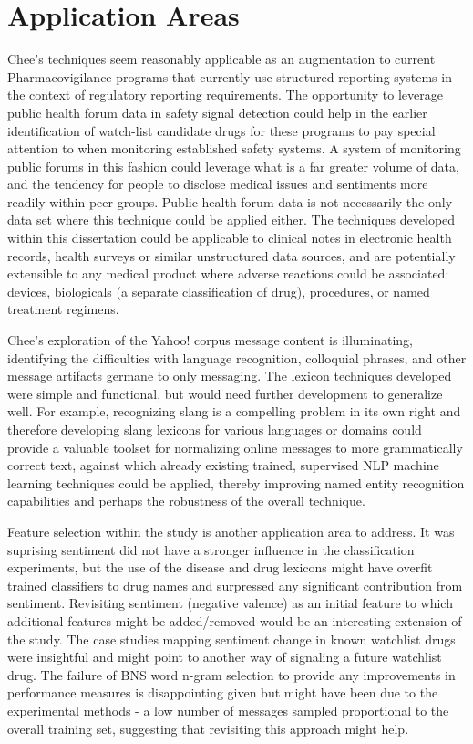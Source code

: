 \documentclass[twoside,11pt]{article}
\begin{document}
\section{Application Areas}
Chee's techniques seem reasonably applicable as an augmentation to current Pharmacovigilance programs that currently use structured reporting systems in the context of regulatory reporting requirements. The opportunity to leverage public health forum data in safety signal detection could help in the earlier identification of watch-list candidate drugs for these programs to pay special attention to when monitoring established safety systems. A system of monitoring public forums in this fashion could leverage what is a far greater volume of data, and the tendency for people to disclose medical issues and sentiments more readily within peer groups. Public health forum data is not necessarily the only data set where this technique could be applied either. The techniques developed within this dissertation could be applicable to clinical notes in electronic health records, health surveys or similar unstructured data sources, and are potentially extensible to any medical product where adverse reactions could be associated: devices, biologicals (a separate classification of drug), procedures, or named treatment regimens.

Chee's exploration of the Yahoo! corpus message content is illuminating, identifying the difficulties with language recognition, colloquial phrases, and other message artifacts germane to only messaging. The lexicon techniques developed were simple and functional, but would need further development to generalize well. For example, recognizing slang is a compelling problem in its own right and therefore developing slang lexicons for various languages or domains could provide a valuable toolset for normalizing online messages to more grammatically correct text, against which already existing trained, supervised NLP machine learning techniques could be applied, thereby improving named entity recognition capabilities and perhaps the robustness of the overall technique.

Feature selection within the study is another application area to address. It was suprising sentiment did not have a stronger influence in the classification experiments, but the use of the disease and drug lexicons might have overfit trained classifiers to drug names and surpressed any significant contribution from sentiment. Revisiting sentiment (negative valence) as an initial feature to which additional features might be added/removed would be an interesting extension of the study. The case studies mapping sentiment change in known watchlist drugs were insightful and might point to another way of signaling a future watchlist drug. The failure of BNS word n-gram selection to provide any improvements in performance measures is disappointing given \citep{Forman} but might have been due to the experimental methods - a low number of messages sampled proportional to the overall training set, suggesting that revisiting this approach might help.
\end{document}
